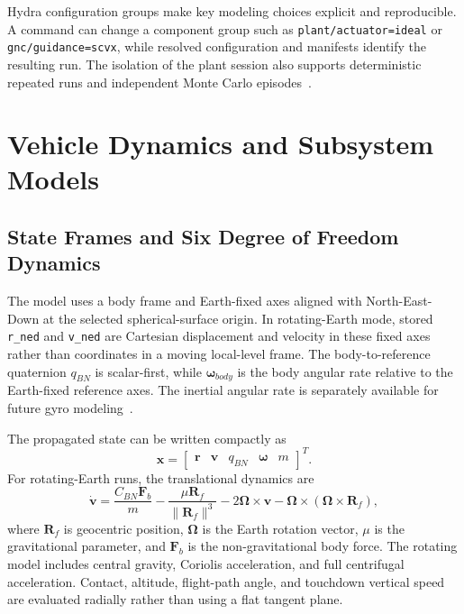 \documentclass[11pt,letterpaper]{article}
\newcommand{\sourcecode}[1]{\texttt{#1}}
\begin{document}
Hydra configuration groups make key modeling choices explicit and reproducible. A command can change a component group such as \sourcecode{plant/actuator=ideal} or \sourcecode{gnc/guidance=scvx}, while resolved configuration and manifests identify the resulting run. The isolation of the plant session also supports deterministic repeated runs and independent Monte Carlo episodes~\cite{readme,architecture}.

\section{Vehicle Dynamics and Subsystem Models}\label{sec:dynamics}

\subsection{State Frames and Six Degree of Freedom Dynamics}

The model uses a body frame and Earth-fixed axes aligned with North-East-Down at the selected spherical-surface origin. In rotating-Earth mode, stored \sourcecode{r\_ned} and \sourcecode{v\_ned} are Cartesian displacement and velocity in these fixed axes rather than coordinates in a moving local-level frame. The body-to-reference quaternion $q_{BN}$ is scalar-first, while $\bm{\omega}_{body}$ is the body angular rate relative to the Earth-fixed reference axes. The inertial angular rate is separately available for future gyro modeling~\cite{physics_report}.

The propagated state can be written compactly as
\begin{equation}
 \bm{x} = \begin{bmatrix}\bm{r} & \bm{v} & q_{BN} & \bm{\omega} & m\end{bmatrix}^{T}.
\end{equation}
For rotating-Earth runs, the translational dynamics are
\begin{equation}\label{eq:translation}
 \dot{\bm{v}} = \frac{C_{BN}\bm{F}_{b}}{m}
 - \frac{\mu\bm{R}_{f}}{\lVert\bm{R}_{f}\rVert^{3}}
 - 2\bm{\Omega}\times\bm{v}
 - \bm{\Omega}\times(\bm{\Omega}\times\bm{R}_{f}),
\end{equation}
where $\bm{R}_{f}$ is geocentric position, $\bm{\Omega}$ is the Earth rotation vector, $\mu$ is the gravitational parameter, and $\bm{F}_{b}$ is the non-gravitational body force. The rotating model includes central gravity, Coriolis acceleration, and full centrifugal acceleration. Contact, altitude, flight-path angle, and touchdown vertical speed are evaluated radially rather than using a flat tangent plane.
\end{document}
